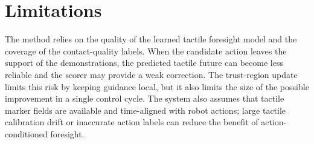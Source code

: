 \documentclass[10pt,letterpaper]{article}
\begin{document}
\section{Limitations}
\label{sec:limitations}

The method relies on the quality of the learned tactile foresight model and the
coverage of the contact-quality labels. When the candidate action leaves the
support of the demonstrations, the predicted tactile future can become less
reliable and the scorer may provide a weak correction. The trust-region update
limits this risk by keeping guidance local, but it also limits the size of the
possible improvement in a single control cycle. The system also assumes that
tactile marker fields are available and time-aligned with robot actions; large
tactile calibration drift or inaccurate action labels can reduce the benefit of
action-conditioned foresight.
\end{document}

